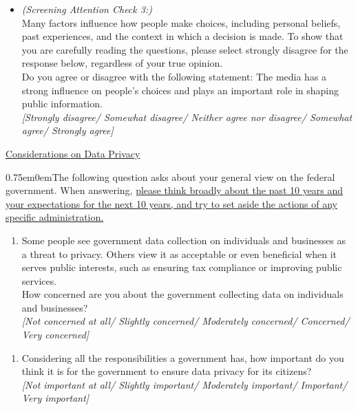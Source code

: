 \documentclass[11pt]{article}
\begin{document}
\begin{itemize}
    \item \textit{(Screening Attention Check 3:)} \\ Many factors influence how people make choices, including personal beliefs, past experiences, and the context in which a decision is made. To show that you are carefully reading the questions, please select strongly disagree for the response below, regardless of your true opinion. \\[0.25em]
    Do you agree or disagree with the following statement: The media has a strong influence on people’s choices and plays an important role in shaping public information. \\ \textit{[Strongly disagree/ Somewhat disagree/ Neither agree nor disagree/ Somewhat agree/ Strongly agree]}
\end{itemize}
\underline{Considerations on Data Privacy} \\
\begin{adjustwidth}{0.75em}{0em}The following question asks about your general view on the federal government. When answering, \uline{please think broadly about the past 10 years and your expectations for the next 10 years, and try to set aside the actions of any specific administration.}\end{adjustwidth}

\begin{enumerate}[resume]
    \item Some people see government data collection on individuals and businesses as a threat to privacy. Others view it as acceptable or even beneficial when it serves public interests, such as ensuring tax compliance or improving public services. \\ How concerned are you about the government collecting data on individuals and businesses? \\
    \textit{[Not concerned at all/ Slightly concerned/ Moderately concerned/ Concerned/ Very concerned]}
\end{enumerate}
\begin{enumerate}[resume]
    \item Considering all the responsibilities a government has, how important do you think it is for the government to ensure data privacy for its citizens? \\
    \textit{[Not important at all/ Slightly important/ Moderately important/ Important/ Very important]}
\end{enumerate}    
\end{document}
